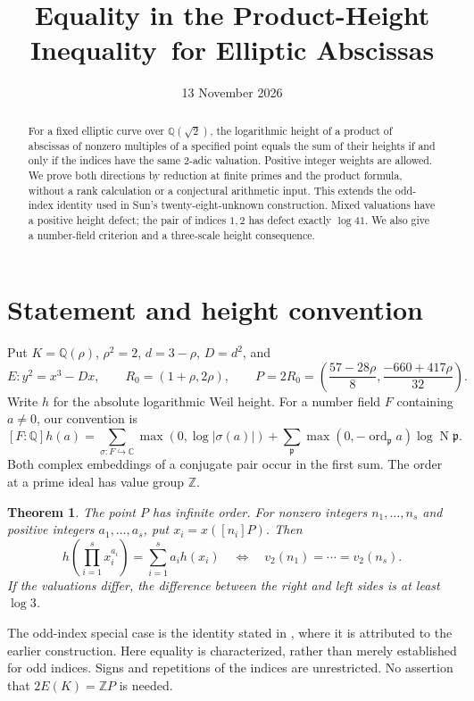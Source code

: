 \documentclass[11pt,a4paper]{article}
\title{Equality in the Product-Height Inequality\ for Elliptic Abscissas}
\author{}\date{13 November 2026}
\newtheorem{theorem}{Theorem}[section]
\newcommand{\Q}{\mathbb Q}\newcommand{\Z}{\mathbb Z}
\DeclareMathOperator{\ord}{ord}\DeclareMathOperator{\N}{N}
\begin{document}
\maketitle
\begin{abstract}
For a fixed elliptic curve over $\Q(\sqrt2)$, the logarithmic height of a
product of abscissas of nonzero multiples of a specified point equals the
sum of their heights if and only if the indices have the same $2$-adic
valuation. Positive integer weights are allowed. We prove both directions
by reduction at finite primes and the product formula, without a rank
calculation or a conjectural arithmetic input. This extends the odd-index
identity used in Sun's twenty-eight-unknown construction. Mixed valuations
have a positive height defect; the pair of indices $1,2$ has defect
exactly $\log41$. We also give a number-field criterion and a three-scale
height consequence.
\end{abstract}

\section{Statement and height convention}
Put $K=\Q(\rho)$, $\rho^2=2$, $d=3-\rho$, $D=d^2$, and
\[
 E:y^2=x^3-Dx,\qquad R_0=(1+\rho,2\rho),\qquad P=2R_0
 =\left(\frac{57-28\rho}{8},\frac{-660+417\rho}{32}\right).
\]
Write $h$ for the absolute logarithmic Weil height. For a number field
$F$ containing $a\ne0$, our convention is
\[
 [F:\Q]h(a)=\sum_{\sigma:F\hookrightarrow\mathbb C}
 \max(0,\log|\sigma(a)|)
 +\sum_{\mathfrak p}\max(0,-\ord_{\mathfrak p}a)\log\N\mathfrak p.
\]
Both complex embeddings of a conjugate pair occur in the first sum.
The order at a prime ideal has value group $\Z$.

\begin{theorem}\label{thm:main}
The point $P$ has infinite order. For nonzero integers $n_1,\ldots,n_s$
and positive integers $a_1,\ldots,a_s$, put $x_i=x([n_i]P)$.
Then
\[
 h\left(\prod_{i=1}^s x_i^{a_i}\right)=\sum_{i=1}^s a_i h(x_i)
 \quad\Longleftrightarrow\quad
 v_2(n_1)=\cdots=v_2(n_s).
\]
If the valuations differ, the difference between the right and left
sides is at least $\log3$.
\end{theorem}
The odd-index special case is the identity stated in
\cite[Lemma 2.2]{Sun}, where it is attributed to the earlier construction.
Here equality is characterized, rather than merely established for odd
indices. Signs and repetitions of the indices are unrestricted.
No assertion that $2E(K)=\Z P$ is needed.
\end{document}
